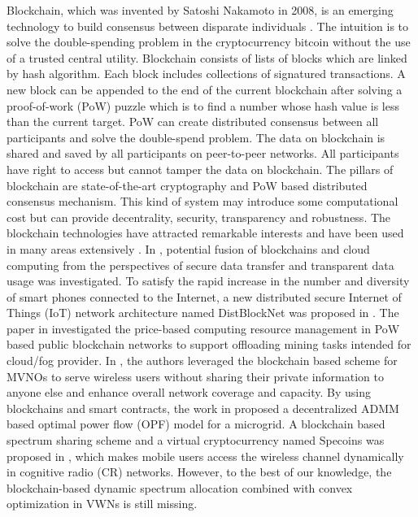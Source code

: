 \documentclass[journal]{IEEEtran}
\begin{document}
Blockchain, which was invented by Satoshi Nakamoto in 2008, is an emerging technology to build consensus between disparate individuals \cite{SNakamoto}. The intuition is to solve the double-spending problem in the cryptocurrency bitcoin without the use of a trusted central utility. Blockchain consists of lists of blocks which are linked by hash algorithm. Each block includes collections of signatured transactions. A new block can be appended to the end of the current blockchain after solving a proof-of-work (PoW) puzzle which is to find a number whose hash value is less than the current target. PoW can create distributed consensus between all participants and solve the double-spend problem. The data on blockchain is shared and saved by all participants on peer-to-peer networks. All participants have right to access but cannot tamper the data on blockchain. The pillars of blockchain are state-of-the-art cryptography and PoW based distributed consensus mechanism. This kind of system may introduce some computational cost but can provide decentrality, security, transparency and robustness. The blockchain technologies have attracted remarkable interests and have been used in many areas extensively \cite{KGai,PKSharma,ZXiong,DBRawat,E. Münsing,KKotobi}. In \cite{KGai}, potential fusion of blockchains and cloud computing from the perspectives of secure data transfer and transparent data usage was investigated. To satisfy the rapid increase in the number and diversity
of smart phones connected to the Internet, a new distributed secure Internet of Things (IoT) network architecture named DistBlockNet was proposed in \cite{PKSharma}. The paper in \cite{ZXiong} investigated the price-based computing resource management in PoW based public blockchain networks to support offloading mining tasks intended for cloud/fog provider. In \cite{DBRawat}, the authors leveraged the blockchain based scheme for MVNOs to serve wireless users without sharing their
private information to anyone else
and enhance overall network coverage and capacity. By using blockchains and smart contracts, the work in \cite{E. Münsing} proposed a decentralized ADMM based optimal power flow (OPF) model for a microgrid. A blockchain based spectrum sharing scheme and a virtual cryptocurrency named Specoins was proposed in \cite{KKotobi}, which makes mobile users access the wireless channel dynamically in cognitive radio (CR) networks. However, to the best of our knowledge, the blockchain-based dynamic spectrum allocation combined with convex optimization in VWNs is still missing.
\end{document}
